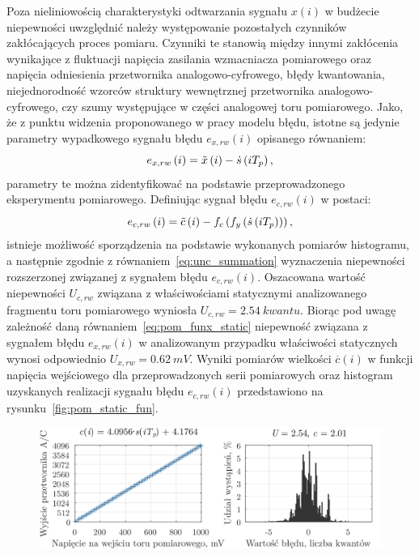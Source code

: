 Poza nieliniowością charakterystyki odtwarzania sygnału $x(i)$ w budżecie niepewności uwzględnić należy występowanie pozostałych czynników zakłócających proces pomiaru. Czynniki te stanowią między innymi zakłócenia wynikające z fluktuacji napięcia zasilania wzmacniacza pomiarowego oraz napięcia odniesienia przetwornika analogowo-cyfrowego, błędy kwantowania, niejednorodność wzorców struktury wewnętrznej przetwornika analogowo-cyfrowego, czy szumy występujące w części analogowej toru pomiarowego. Jako, że z punktu widzenia proponowanego w pracy modelu błędu, istotne są jedynie parametry wypadkowego sygnału błędu $e_{x,rw}(i)$ opisanego równaniem:
\begin{equation}
e_{x,rw} \left(i\right) = \tilde{x} \left(i\right) - \dot{s} \left(iT_{p}\right) \label{eq:pom_funx_error},
\end{equation}
parametry te można zidentyfikować na podstawie przeprowadzonego eksperymentu pomiarowego. Definiując sygnał błędu $e_{c,rw}(i)$ w postaci:
\begin{equation}
e_{c,rw} \left(i\right) = \tilde{c} \left(i\right) - f_{c} \left(f_{y} \left(\dot{s} \left(iT_{p}\right)\right)\right) \label{eq:pom_func_error},
\end{equation}
istnieje możliwość sporządzenia na podstawie wykonanych pomiarów histogramu, a następnie zgodnie z równaniem~\eqref{eq:unc_summation} wyznaczenia niepewności rozszerzonej związanej z sygnałem błędu $e_{c,rw}(i)$. Oszacowana wartość niepewności $U_{c,rw}$ związana z właściwościami statycznymi analizowanego fragmentu toru pomiarowego wyniosła $U_{c,rw} = \qty{2.54}{kwantu}$. Biorąc pod uwagę zależność daną równaniem~\eqref{eq:pom_funx_static} niepewność związana z sygnałem błędu $e_{x,rw}(i)$ w analizowanym przypadku właściwości statycznych wynosi odpowiednio $U_{x,rw} = \qty{0.62}{mV}$. Wyniki pomiarów wielkości $\overline{c}(i)$ w funkcji napięcia wejściowego dla przeprowadzonych serii pomiarowych oraz histogram uzyskanych realizacji sygnału błędu $e_{c,rw}(i)$ przedstawiono na rysunku~\ref{fig:pom_static_fun}.

\begin{figure}[htb!]
\begin{center}
\includegraphics{obrazki/static_adcout}
\end{center}
\end{figure}


